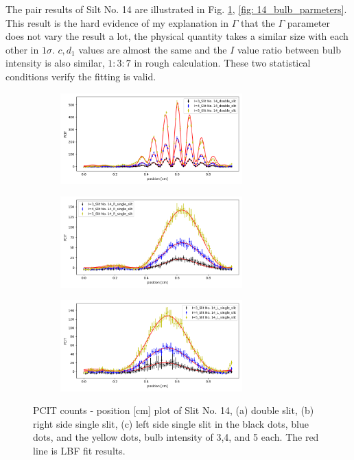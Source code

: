 \documentclass{article}
\begin{document}
The pair results of Silt No. 14 are illustrated in Fig. \ref{fig: 14_bulb_plot}, \ref{fig: 14_bulb_parmeters}.
This result is the hard evidence of my explanation in $\Gamma$ that the $\Gamma$ parameter does not vary the result a lot, the physical quantity takes a similar size with each other in $1 \sigma$.
$c, d_1$ values are almost the same and the $I$ value ratio between bulb intensity is also similar, $1:3:7$ in rough calculation.
These two statistical conditions verify the fitting is valid.

\begin{figure}[H]
    \begin{subfigure}[b]{7cm}
        \centering
        \includegraphics[width=7cm]{../results/bulb(14_double_slit)_fig.png}
        \caption{}
    \end{subfigure}
    \hfill
    \begin{subfigure}[b]{7cm}
      \centering
      \includegraphics[width=7cm]{../results/bulb(14_R_single_slit)_fig.png}
      \caption{}
  \end{subfigure}
  \hfill
  \centering
  \begin{subfigure}[b]{7cm}
    \centering
    \includegraphics[width=7cm]{../results/bulb(14_L_single_slit)_fig.png}
    \caption{}
  \end{subfigure}
  \hfill
    \caption{PCIT counts - position [cm] plot of Slit No. 14, (a) double slit, (b) right side single slit, (c) left side single slit in the black dots, blue dots, and the yellow dots, bulb intensity of 3,4, and 5 each.
        The red line is LBF fit results.
     }
    \label{fig: 14_bulb_plot}
  \end{figure}
\end{document}
